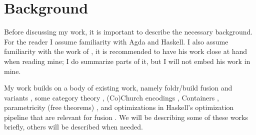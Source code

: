 
\section{Background}
Before discussing my work, it is important to describe the necessary background.
For the reader I assume familiarity with Agda and Haskell.
I also assume familiarity with the work of \cite{Harper2011}, it is recommended to have his work close at hand when reading mine; I do summarize parts of it, but I will not embed his work in mine.

My work builds on a body of existing work, namely foldr/build fusion and variants \citep{Gill1993,Svenningsson2002,Coutts2007}, some category theory \citep{Ahrens2022}, (Co)Church encodings \citep{Harper2011}, Containers \citep{Abbott2005}, parametricity (free theorems) \citep{Wadler1989}, and optimizations in Haskell's optimization pipeline that are relevant for fusion \citep{Jones1996}.
We will be describing some of these works briefly, others will be described when needed.



